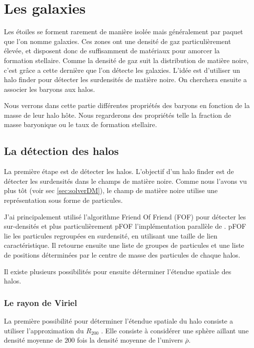 \chapter{Les galaxies}
\label{sec:galaxies}

Les étoiles se forment rarement de manière isolée mais généralement par paquet que l'on nomme galaxies.
Ces zones ont une densité de gaz particulièrement élevée, et disposent donc de suffisamment de matériaux pour amorcer la formation stellaire.
Comme la densité de gaz suit la distribution de matière noire, c'est grâce a cette dernière que l'on détecte les galaxies.
L'idée est d'utiliser un halo finder pour détecter les surdensités de matière noire.
On cherchera ensuite a associer les baryons aux halos.

Nous verrons dans cette partie différentes propriétés des baryons en fonction de la masse de leur halo hôte.
Nous regarderons des propriétés telle la fraction de masse baryonique ou le taux de formation stellaire.


\section{La détection des halos}
La première étape est de détecter les halos.
L'objectif d'un halo finder est de détecter les surdensités dans le champs de matière noire.
Comme nous l'avons vu plus tôt (voir sec \ref{sec:solverDM}), le champ de matière noire utilise une représentation sous forme de particules.

J'ai principalement utilisé l’algorithme Friend Of Friend (FOF) pour détecter les sur-densités et plus particulièrement pFOF l'implémentation parallèle de \cite{2014A&A...564A..13R}.
pFOF lie les particules regroupées en surdensité, en utilisant une taille de lien caractéristique.
Il retourne ensuite une liste de groupes de particules et une liste de positions déterminées par le centre de masse des particules de chaque halos.

Il existe plusieurs possibilités pour ensuite déterminer l'étendue spatiale des halos.

\subsection{Le rayon de Viriel}
La première possibilité pour déterminer l'étendue spatiale du halo consiste a utiliser l'approximation du $R_{200}$ \citep{1997ApJ...490..493N}.
Elle consiste à considérer une sphère aillant une densité moyenne de $200$ fois la densité moyenne de l'univers $\bar{\rho}$.

